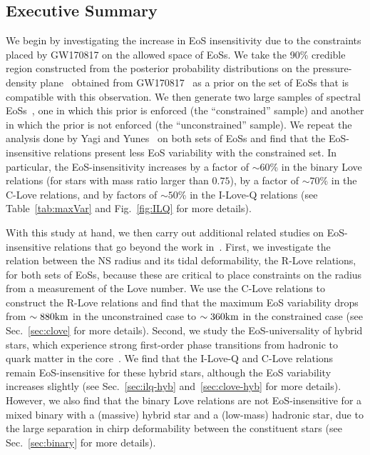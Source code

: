 \documentclass[prd,twocolumn,nofootinbib,superscriptaddress,amsmath,amssymb]{revtex4-1}
\begin{document}
\subsection{Executive Summary}

We begin by investigating the increase in EoS insensitivity due to the constraints placed by GW170817 on the allowed space of EoSs. We take the 90\% credible region constructed from the posterior probability distributions on the pressure-density plane~\cite{LIGO:posterior} obtained from GW170817~\cite{TheLIGOScientific:2017qsa} as a prior on the set of EoSs that is compatible with this observation. We then generate two large samples of spectral EoSs~\cite{Lindblom:2018rfr}, one in which this prior is enforced (the ``constrained'' sample) and another in which the prior is not enforced (the ``unconstrained'' sample). We repeat the analysis done by Yagi and Yunes~\cite{Yagi:binLove,Yagi:ILQ} on both sets of EoSs and find that the EoS-insensitive relations present less EoS variability with the constrained set. In particular, the EoS-insensitivity increases by a factor of $\sim 60$\% in the binary Love relations (for stars with mass ratio larger than $0.75$), by a factor of $\sim 70\%$ in the C-Love relations, and by factors of $\sim 50$\% in the I-Love-Q relations (see Table~\ref{tab:maxVar} and Fig.~\ref{fig:ILQ} for more details). 

With this study at hand, we then carry out additional related studies on EoS-insensitive relations that go beyond the work in~\cite{Yagi:binLove,Yagi:ILQ}. First, we investigate the relation between the NS radius and its tidal deformability, the R-Love relations, for both sets of EoSs, because these are critical to place constraints on the radius from a measurement of the Love number.  We use the C-Love relations to construct the R-Love relations and find that the maximum EoS variability drops from $\sim 880 {\rm{km}}$ in the unconstrained case to $\sim 360 {\rm{km}}$ in the constrained case (see Sec.~\ref{sec:clove} for more details). Second, we study the EoS-universality of hybrid stars, which experience strong first-order phase transitions from hadronic to quark matter in the core~\cite{Paschalidis2018}. We find that the I-Love-Q and C-Love relations remain EoS-insensitive for these hybrid stars, although the EoS variability increases slightly (see Sec.~\ref{sec:ilq-hyb} and~\ref{sec:clove-hyb} for more details). However, we also find that the binary Love relations are not EoS-insensitive for a mixed binary with a (massive) hybrid star and a (low-mass) hadronic star, due to the large separation in chirp deformability between the constituent stars (see Sec.~\ref{sec:binary} for more details).
\end{document}
